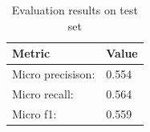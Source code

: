 \begin{table}[b]
\center
\small
    \caption{Evaluation results on test set}
  \label{tab:eval_research_field}
  \begin{tabular}{ll}
  \toprule
      Metric & Value \\
  \midrule
      Micro precisison:  & 0.554 \\
      Micro recall: 	 & 0.564 \\
      Micro f1:          & 0.559 \\
  \bottomrule
\end{tabular}
\end{table}






